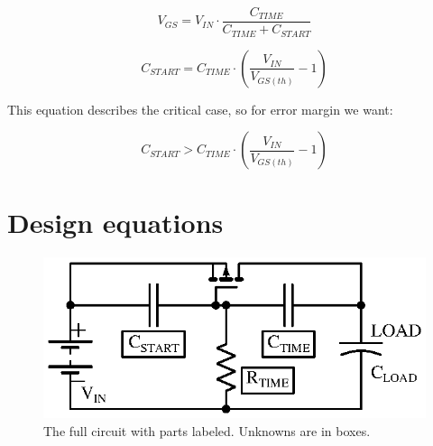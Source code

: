 \documentclass[letterpaper,12pt]{article}
\begin{document}
$$ V_{GS} = V_{IN} \cdot \frac{C_{TIME}}{C_{TIME} + C_{START}} $$

$$ C_{START} = C_{TIME} \cdot \left( \frac{V_{IN}}{V_{GS(th)}} - 1 \right) $$

This equation describes the critical case, so for error margin we want:

$$ C_{START} > C_{TIME} \cdot \left( \frac{V_{IN}}{V_{GS(th)}} - 1 \right) $$

\section{Design equations}
\label{sec:equations}

\begin{figure}[H]
\centering
\includegraphics{just_ckt_labeled}
\caption{The full circuit with parts labeled. Unknowns are in boxes.}
\end{figure}
\end{document}
